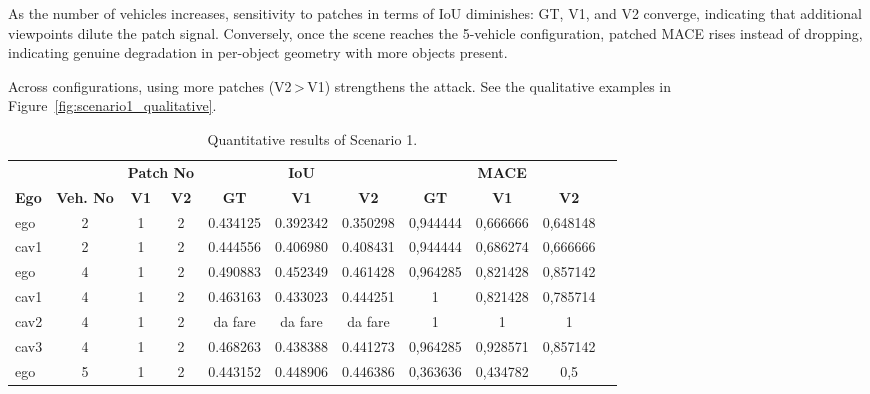 As the number of vehicles increases, sensitivity to patches in terms of IoU diminishes: GT, V1, and V2 converge, indicating that additional viewpoints dilute the patch signal.
Conversely, once the scene reaches the 5-vehicle configuration, patched MACE rises instead of dropping, indicating genuine degradation in per-object geometry with more objects present.

Across configurations, using more patches (V2\,>\,V1) strengthens the attack.
See the qualitative examples in Figure~\ref{fig:scenario1_qualitative}.

\begin{table}[H]
    \centering
    \caption{Quantitative results of Scenario 1.}
    \label{tab:scenario1_results}
    \begin{adjustbox}{max width=\textwidth}
        \begin{tabularx}{\textwidth}{l c c c c c c c c c c}
            \toprule
                &             &   \multicolumn{2}{c}{\textbf{Patch No}}  & \multicolumn{3}{c}{\textbf{IoU}} & \multicolumn{3}{c}{\textbf{MACE}}                            \\
            \cmidrule(lr){5-7}\cmidrule(lr){8-10}
            \textbf{Ego}           &
            \textbf{Veh. No}       &
            \textbf{V1}      &
            \textbf{V2}      &
            \textbf{GT}            & \textbf{V1} & \textbf{V2} &
            \textbf{GT}            & \textbf{V1} & \textbf{V2}                                                                                                           \\
            \midrule %
            ego         & 2  & 1 & 2 & 0.434125 & 0.392342 & 0.350298 & 0,944444 & 0,666666 & 0,648148 \\
            cav1        & 2  & 1 & 2 & 0.444556 & 0.406980 & 0.408431 & 0,944444 & 0,686274 & 0,666666 \\
            \midrule
            ego         & 4  & 1 & 2 & 0.490883 & 0.452349  & 0.461428 & 0,964285 & 0,821428 & 0,857142 \\
            cav1        & 4  & 1 & 2 & 0.463163 & 0.433023  & 0.444251 & 1 & 0,821428 & 0,785714 \\
            cav2        & 4  & 1 & 2 & da fare  & da fare   & da fare  & 1 & 1 & 1 \\
            cav3        & 4  & 1 & 2 & 0.468263 & 0.438388  & 0.441273 & 0,964285 & 0,928571 & 0,857142 \\
            \midrule
            ego         & 5  & 1 & 2 & 0.443152 & 0.448906  & 0.446386 & 0,363636 & 0,434782 & 0,5 \\

\end{tabularx}
\end{adjustbox}
\end{table}

